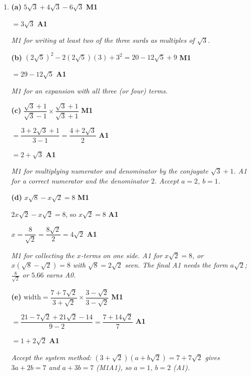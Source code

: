 \documentclass[12pt, twoside]{article}
\begin{document}
\begin{enumerate}[itemsep=0.3cm]
\newpage

\item[5.] [Maximum mark: 13]

\textbf{(a)} $5\sqrt{3} + 4\sqrt{3} - 6\sqrt{3}$ \hfill \textbf{M1}

$= 3\sqrt{3}$ \hfill \textbf{A1}

\emph{M1 for writing at least two of the three surds as multiples of
$\sqrt{3}$.}

\textbf{(b)} $\left(2\sqrt{5}\right)^{2} - 2\left(2\sqrt{5}\right)(3) + 3^{2} = 20 - 12\sqrt{5} + 9$ \hfill \textbf{M1}

$= 29 - 12\sqrt{5}$ \hfill \textbf{A1}

\emph{M1 for an expansion with all three (or four) terms.}

\textbf{(c)} $\dfrac{\sqrt{3} + 1}{\sqrt{3} - 1} \times \dfrac{\sqrt{3} + 1}{\sqrt{3} + 1}$ \hfill \textbf{M1}

$= \dfrac{3 + 2\sqrt{3} + 1}{3 - 1} = \dfrac{4 + 2\sqrt{3}}{2}$ \hfill \textbf{A1}

$= 2 + \sqrt{3}$ \hfill \textbf{A1}

\emph{M1 for multiplying numerator and denominator by the conjugate
$\sqrt{3} + 1$. A1 for a correct numerator and the denominator $2$. Accept
$a = 2$, $b = 1$.}

\textbf{(d)} $x\sqrt{8} - x\sqrt{2} = 8$ \hfill \textbf{M1}

$2x\sqrt{2} - x\sqrt{2} = 8$, \quad so $x\sqrt{2} = 8$ \hfill \textbf{A1}

$x = \dfrac{8}{\sqrt{2}} = \dfrac{8\sqrt{2}}{2} = 4\sqrt{2}$ \hfill \textbf{A1}

\emph{M1 for collecting the $x$-terms on one side. A1 for
$x\sqrt{2} = 8$, or $x\left(\sqrt{8} - \sqrt{2}\right) = 8$ with
$\sqrt{8} = 2\sqrt{2}$ seen. The final A1 needs the form $a\sqrt{2}$;
$\frac{8}{\sqrt{2}}$ or $5.66$ earns A0.}

\textbf{(e)} $\text{width} = \dfrac{7 + 7\sqrt{2}}{3 + \sqrt{2}} \times \dfrac{3 - \sqrt{2}}{3 - \sqrt{2}}$ \hfill \textbf{M1}

$= \dfrac{21 - 7\sqrt{2} + 21\sqrt{2} - 14}{9 - 2} = \dfrac{7 + 14\sqrt{2}}{7}$ \hfill \textbf{A1}

$= 1 + 2\sqrt{2}$ \hfill \textbf{A1}

\emph{Accept the system method: $(3 + \sqrt{2})(a + b\sqrt{2}) = 7 + 7\sqrt{2}$
gives $3a + 2b = 7$ and $a + 3b = 7$ (M1A1), so $a = 1$, $b = 2$ (A1).}


\end{enumerate}
\end{document}
